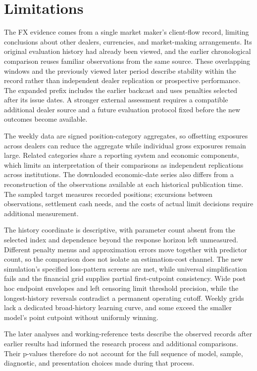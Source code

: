 \documentclass[11pt,a4paper]{article}
\begin{document}
\FloatBarrier

\section{Limitations}\label{sec:limitations}

The FX evidence comes from a single market maker's client-flow record, limiting conclusions about other dealers, currencies, and market-making arrangements. Its original evaluation history had already been viewed, and the earlier chronological comparison reuses familiar observations from the same source. These overlapping windows and the previously viewed later period describe stability within the record rather than independent dealer replication or prospective performance. The expanded prefix includes the earlier backcast and uses penalties selected after its issue dates. A stronger external assessment requires a compatible additional dealer source and a future evaluation protocol fixed before the new outcomes become available.


The weekly data are signed position-category aggregates, so offsetting exposures across dealers can reduce the aggregate while individual gross exposures remain large. Related categories share a reporting system and economic components, which limits an interpretation of their comparisons as independent replications across institutions. The downloaded economic-date series also differs from a reconstruction of the observations available at each historical publication time. The sampled target measures recorded positions; excursions between observations, settlement cash needs, and the costs of actual limit decisions require additional measurement.


The history coordinate is descriptive, with parameter count absent from the selected index and dependence beyond the response horizon left unmeasured. Different penalty menus and approximation errors move together with predictor count, so the comparison does not isolate an estimation-cost channel. The new simulation's specified loss-pattern screens are met, while universal simplification fails and the financial grid supplies partial first-cutpoint consistency. Wide post hoc endpoint envelopes and left censoring limit threshold precision, while the longest-history reversals contradict a permanent operating cutoff. Weekly grids lack a dedicated broad-history learning curve, and some exceed the smaller model's point cutpoint without uniformly winning.

The later analyses and working-reference tests describe the observed records after earlier results had informed the research process and additional comparisons. Their p-values therefore do not account for the full sequence of model, sample, diagnostic, and presentation choices made during that process.
\end{document}
